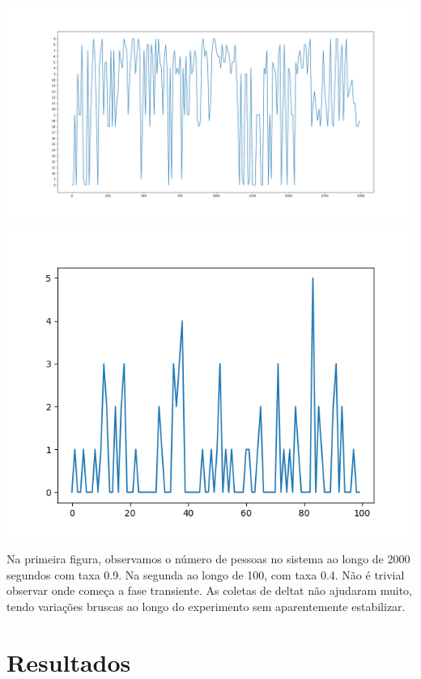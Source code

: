 \documentclass{article}
\begin{document}
\includegraphics[width=\textwidth]{n_evo_1.png}

\includegraphics[width=\textwidth]{n_evo_2.png}

Na primeira figura, observamos o número de pessoas no sistema ao longo de 2000 segundos com taxa 0.9. Na segunda ao longo de 100, com taxa 0.4. Não é trivial observar onde começa a fase transiente. As coletas de deltat não ajudaram muito, tendo variações bruscas ao longo do experimento sem aparentemente estabilizar.

\section{Resultados}
\end{document}

